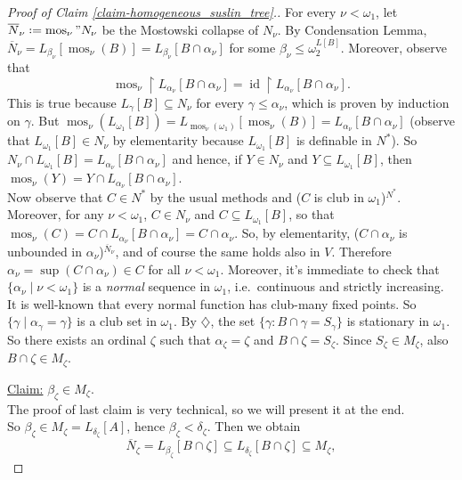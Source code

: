 \documentclass[11pt,a4paper]{report}
\theoremstyle{definition}
\theoremstyle{num.custom-title}
\theoremstyle{custom-title}
\newenvironment{claim}[1]{\par\noindent\underline{Claim#1:}\space}{} %
\DeclareMathOperator{\id}{id}
\DeclareMathOperator{\sse}{\subseteq}
\DeclareMathOperator{\restr}{\upharpoonright}
\DeclareMathOperator{\mos}{mos}
\newcommand{\ol}{\overline}
\newcommand*{\defeq}{\mathrel{\rlap{%
                     \raisebox{0.3ex}{$\cdot$}}%
                     \raisebox{-0.3ex}{$\cdot$}}%
                     =}
\begin{document}
\begin{proof}[Proof of Claim \ref{claim-homogeneous_suslin_tree}.]
For every $\nu < \omega_1$, let $\ol{N}_\nu \defeq \mos_\nu" N_\nu$ be the Mostowski collapse of $N_\nu$. By Condensation Lemma, $\ol{N}_\nu = L_{\beta_\nu}[\mos_\nu(B)] = L_{\beta_\nu}[B \cap \alpha_\nu]$ for some $\beta_\nu \leq \omega_2^{L[B]}$. Moreover, observe that
\[
\mos_\nu \restr L_{\alpha_\nu} [B \cap \alpha_\nu] = \id \restr L_{\alpha_\nu} [B \cap \alpha_\nu].
\]
This is true because $L_\gamma[B] \sse N_\nu$ for every $\gamma \leq \alpha_\nu$, which is proven by induction on $\gamma$.
But $\mos_\nu(L_{\omega_1}[B]) = L_{\mos_\nu(\omega_1)}[\mos_\nu(B)] = L_{\alpha_\nu}[B \cap \alpha_\nu]$ (observe that $L_{\omega_1}[B] \in N_\nu$ by elementarity because $L_{\omega_1}[B]$ is definable in $N^*$). So $N_\nu \cap L_{\omega_1}[B] = L_{\alpha_\nu}[B \cap \alpha_\nu]$ and hence, if $Y \in N_\nu$ and $Y \sse L_{\omega_1}[B]$, then $\mos_\nu(Y) = Y \cap L_{\alpha_\nu}[B \cap \alpha_\nu]$.
\\[10pt]
Now observe that $C \in N^*$ by the usual methods and ($C$ is club in $\omega_1$)$^{N^*}$. Moreover, for any $\nu < \omega_1$, $C \in N_\nu$ and $C \sse L_{\omega_1}[B]$, so that $\mos_\nu (C) = C \cap L_{\alpha_\nu}[B \cap \alpha_\nu] = C \cap \alpha_\nu$. So, by elementarity, ($C \cap \alpha_\nu$ is unbounded in $\alpha_\nu$)$^{\ol{N}_\nu}$, and of course the same holds also in $V$. Therefore $\alpha_\nu = \sup(C \cap \alpha_\nu) \in C$ for all $\nu < \omega_1$.
Moreover, it's immediate to check that $\{\alpha_\nu \mid \nu < \omega_1\}$ is a \emph{normal} sequence in $\omega_1$, i.e.\ continuous and strictly increasing. It is well-known that every normal function has club-many fixed points. So $\{\gamma \mid \alpha_\gamma = \gamma\}$ is a club set in $\omega_1$. By $\diamondsuit$, the set $\{\gamma : B \cap \gamma = S_\gamma\}$ is stationary in $\omega_1$. So there exists an ordinal $\zeta$ such that $\alpha_\zeta = \zeta$ and $B \cap \zeta = S_\zeta$. Since $S_\zeta \in M_\zeta$, also $B \cap \zeta \in M_\zeta$.
\\[-10pt]
\begin{claim}{}
$\beta_\zeta \in M_\zeta$.
\end{claim}
\\[7pt]
The proof of last claim is very technical, so we will present it at the end.\\
So $\beta_\zeta \in M_\zeta = L_{\delta_\zeta}[A]$, hence $\beta_\zeta < \delta_\zeta$. Then we obtain
\[
\ol{N}_\zeta = L_{\beta_\zeta}[B \cap \zeta] \sse L_{\delta_\zeta}[B \cap \zeta] \sse M_\zeta,
\]
\end{proof}
\end{document}
